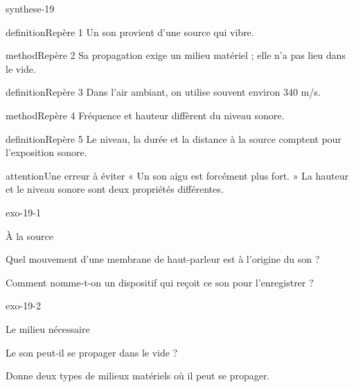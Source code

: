 \documentclass[12pt,twoside,openany]{book}
\begin{document}
\begin{pcFiche}{synthese-19}
\begin{pcEncadre}{definition}{Repère 1}
Un son provient d’une source qui vibre.\par
\end{pcEncadre}
\begin{pcEncadre}{method}{Repère 2}
Sa propagation exige un milieu matériel ; elle n’a pas lieu dans le vide.\par
\end{pcEncadre}
\begin{pcEncadre}{definition}{Repère 3}
Dans l’air ambiant, on utilise souvent environ 340 m/s.\par
\end{pcEncadre}
\begin{pcEncadre}{method}{Repère 4}
Fréquence et hauteur diffèrent du niveau sonore.\par
\end{pcEncadre}
\begin{pcEncadre}{definition}{Repère 5}
Le niveau, la durée et la distance à la source comptent pour l’exposition sonore.\par
\end{pcEncadre}
\begin{pcEncadre}{attention}{Une erreur à éviter}
« Un son aigu est forcément plus fort. » La hauteur et le niveau sonore sont deux propriétés différentes.\par
\end{pcEncadre}
\end{pcFiche}
\clearpage{}
\begin{blocLivre}{exo-19-1}
\begin{exercice}[1]{À la source}
\begin{questions}
\item Quel mouvement d’une membrane de haut-parleur est à l’origine du son ?
\item Comment nomme-t-on un dispositif qui reçoit ce son pour l’enregistrer ?
\end{questions}
\end{exercice}\end{blocLivre}
\begin{blocLivre}{exo-19-2}
\begin{exercice}[1]{Le milieu nécessaire}
\begin{questions}
\item Le son peut-il se propager dans le vide ?
\item Donne deux types de milieux matériels où il peut se propager.
\end{questions}
\end{exercice}\end{blocLivre}
\end{document}
